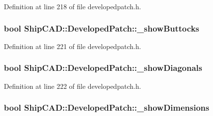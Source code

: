 Definition at line 218 of file developedpatch.\+h.

\subsubsection[{\texorpdfstring{\+\_\+show\+Buttocks}{_showButtocks}}]{\setlength{\rightskip}{0pt plus 5cm}bool Ship\+C\+A\+D\+::\+Developed\+Patch\+::\+\_\+show\+Buttocks\hspace{0.3cm}{\ttfamily [protected]}}\hypertarget{classShipCAD_1_1DevelopedPatch_a647c43e415156bab3ecda6a849d4bb70}{}\label{classShipCAD_1_1DevelopedPatch_a647c43e415156bab3ecda6a849d4bb70}


Definition at line 221 of file developedpatch.\+h.

\subsubsection[{\texorpdfstring{\+\_\+show\+Diagonals}{_showDiagonals}}]{\setlength{\rightskip}{0pt plus 5cm}bool Ship\+C\+A\+D\+::\+Developed\+Patch\+::\+\_\+show\+Diagonals\hspace{0.3cm}{\ttfamily [protected]}}\hypertarget{classShipCAD_1_1DevelopedPatch_aff3046ee214026327f4cfda2733c31c6}{}\label{classShipCAD_1_1DevelopedPatch_aff3046ee214026327f4cfda2733c31c6}


Definition at line 222 of file developedpatch.\+h.

\subsubsection[{\texorpdfstring{\+\_\+show\+Dimensions}{_showDimensions}}]{\setlength{\rightskip}{0pt plus 5cm}bool Ship\+C\+A\+D\+::\+Developed\+Patch\+::\+\_\+show\+Dimensions\hspace{0.3cm}{\ttfamily [protected]}}\hypertarget{classShipCAD_1_1DevelopedPatch_a349177098a4fcdbc6bf3812a79e3cb49}{}\label{classShipCAD_1_1DevelopedPatch_a349177098a4fcdbc6bf3812a79e3cb49}


